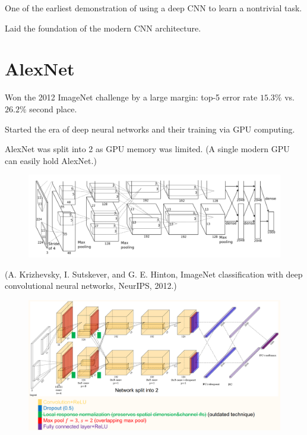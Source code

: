 \documentclass{report}
\begin{document}
\begin{concept}
    One of the earliest demonstration of using a deep CNN to learn a nontrivial task.

    Laid the foundation of the modern CNN architecture.
\end{concept}

\section{AlexNet}

\begin{definition}[7.4][AlexNet]
    Won the 2012 ImageNet challenge by a large margin: top-5 error rate $15.3 \%$ vs. $26.2 \%$ second place.

    Started the era of deep neural networks and their training via GPU computing.

    AlexNet was split into 2 as GPU memory was limited. (A single modern GPU can easily hold AlexNet.)

    \begin{figure}[H]
        \centering
        \includegraphics[width=1.0\textwidth]{.././assets/7.4.png}
    \end{figure}

    (A. Krizhevsky, I. Sutskever, and G. E. Hinton, ImageNet classification with deep convolutional neural networks, NeurIPS, 2012.)
\end{definition}

\begin{definition}
    \begin{figure}[H]
        \centering
        \includegraphics[width=1.0\textwidth]{.././assets/7.5.png}
    \end{figure}
\end{definition}
\end{document}
